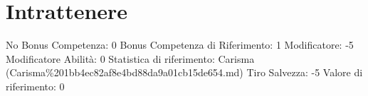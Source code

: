 \section{Intrattenere}\label{intrattenere}

\begin{description}
\tightlist
\item[Tags: ABI]
No Bonus Competenza: 0 Bonus Competenza di Riferimento: 1 Modificatore:
-5 Modificatore Abilità: 0 Statistica di riferimento: Carisma
(Carisma\%201bb4ec82af8e4bd88da9a01cb15de654.md) Tiro Salvezza: -5
Valore di riferimento: 0
\end{description}
